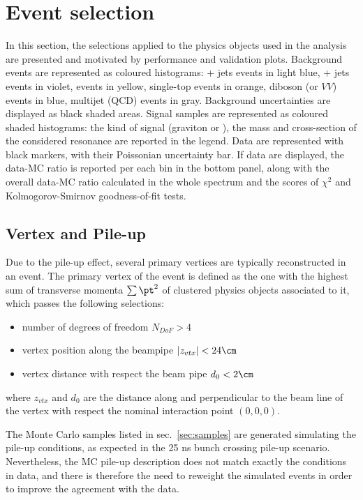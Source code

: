 \section{Event selection}
\label{sec:objects}

In this section, the selections applied to the physics objects used in the analysis are presented and motivated by performance and validation plots. Background events are represented as coloured histograms: \Z + jets events in light blue, \W + jets events in violet, \ttbar events in yellow, single-top events in orange, diboson (or $VV$) events in blue, multijet (QCD) events in gray. Background uncertainties are displayed as black shaded areas. Signal samples are represented as coloured shaded histograms: the kind of signal (graviton or \Wp), the mass and cross-section of the considered resonance are reported in the legend. Data are represented with black markers, with their Poissonian uncertainty bar. If data are displayed, the data-MC ratio is reported per each bin in the bottom panel, along with the overall data-MC ratio calculated in the whole spectrum and the scores of $\chi^2$ and Kolmogorov-Smirnov goodness-of-fit tests.

\subsection{Vertex and Pile-up}
Due to the pile-up effect, several primary vertices are typically reconstructed in an event. The primary vertex of the event is defined as the one with the highest sum of transverse momenta $\sum \pt^2$ of clustered physics objects associated to it, which passes the following selections:
\begin{itemize}
  \item number of degrees of freedom $N_{DoF}>4$
  \item vertex position along the beampipe $|z_{vtx}|<24\cm$
  \item vertex distance with respect the beam pipe $d_0<2\cm$
\end{itemize}
where $z_{vtx}$ and $d_0$ are the distance along and perpendicular to the beam line of the vertex with respect the nominal interaction point $(0,0,0)$.

\noindent The Monte Carlo samples listed in sec.~\ref{sec:samples} are generated simulating the pile-up conditions, as expected in the 25 ns bunch crossing pile-up scenario. Nevertheless, the MC pile-up description does not match exactly the conditions in data, and there is therefore the need to reweight the simulated events in order to improve the agreement with the data. 

